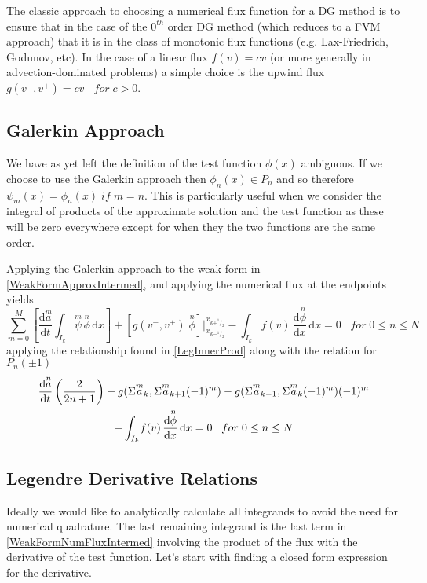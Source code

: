 \documentclass[letterpaper]{article}
\begin{document}
The classic approach to choosing a numerical flux function for a DG method is to ensure that in the case of the $0^{th}$ order DG method (which reduces to a FVM approach) that it is in the class of monotonic flux functions (e.g. Lax-Friedrich, Godunov, etc). In the case of a linear flux $f(v) = cv$ (or more generally in advection-dominated problems) a simple choice is the upwind flux $g(v^-,v^+) = cv^- \;for\; c>0$.

\subsection{Galerkin Approach}
We have as yet left the definition of the test function $\phi(x)$ ambiguous. If we choose to use the Galerkin approach then $\phi_n(x) \in P_n$ and so therefore $\psi_m(x) = \phi_n(x) \;if\; m=n$. This is particularly useful when we consider the integral of products of the approximate solution and the test function as these will be zero everywhere except for when they the two functions are the same order.

Applying the Galerkin approach to the weak form in \eqref{WeakFormApproxIntermed}, and applying the numerical flux at the endpoints yields
	\begin{equation}\label{WeakFormNumFlux}
	\sum_{m=0}^M \left[ \frac{\mathrm{d}\overset{m}{a}}{\mathrm{d} t} \int_{I_k}\! \overset{m}{\psi} \, \overset{n}{\phi} \,\mathrm{d}x \right] + 
	[g(v^-,v^+) \; \overset{n}{\phi}] \Big\rvert_{x_{k-^1\!/_2}}^{x_{k+^1\!/_2}} -  
	\int_{I_k}\! f(v) \,\frac{\mathrm{d} \overset{n}{\phi}}{\mathrm{d} x} \,\mathrm{d}x = 0
	\;\;\; for \; 0 \leq n \leq N
	\end{equation}
applying the relationship found in \eqref{LegInnerProd} along with the relation for $P_n(\pm 1)$
	\begin{gather}\label{WeakFormNumFluxIntermed}
	\frac{\mathrm{d}\overset{n}{a}}{\mathrm{d} t}\left(\frac{2}{2n+1}\right)
	+ g(\Sigma \overset{m}{a}_k,\Sigma \overset{m}{a}_{k+1}(-1)^m) - g(\Sigma \overset{m}{a}_{k-1},\Sigma \overset{m}{a}_{k}(-1)^m) (-1)^m\\
	- \int_{I_k}\! f(v) \,\frac{\mathrm{d} \overset{n}{\phi}}{\mathrm{d} x} \,\mathrm{d}x = 0
	\;\;\; for \; 0 \leq n \leq N \notag
	\end{gather}

\subsection{Legendre Derivative Relations}
Ideally we would like to analytically calculate all integrands to avoid the need for numerical quadrature. The last remaining integrand is the last term in \eqref{WeakFormNumFluxIntermed} involving the product of the flux with the derivative of the test function. Let's start with finding a closed form expression for the derivative.
\end{document}
